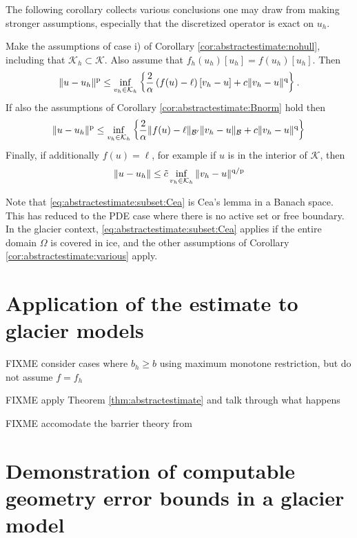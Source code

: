 \documentclass[hidelinks,onefignum,onetabnum,final]{siamart220329}  %
\newcommand{\cB}{\mathcal{B}}
\newcommand{\cK}{\mathcal{K}}
\newcommand{\pp}{{\text{\textnormal{p}}}}
\newcommand{\qq}{{\text{\textnormal{q}}}}
\begin{document}
The following corollary collects various conclusions one may draw from making stronger assumptions, especially that the discretized operator is exact on $u_h$.

\begin{corollary}  \label{cor:abstractestimate:various}  Make the assumptions of case i) of Corollary \ref{cor:abstractestimate:nohull}, including that $\cK_h \subset \cK$.  Also assume that $f_h(u_h)[u_h] = f(u_h)[u_h]$.  Then
\begin{equation}
\|u-u_h\|^\pp \le  \inf_{v_h\in\cK_h} \left\{\frac{2}{\alpha} \left(f(u)-\ell\right)[v_h-u] + c \|v_h - u\|^\qq\right\}. \label{eq:abstractestimate:subset}
\end{equation}
If also the assumptions of Corollary \ref{cor:abstractestimate:Bnorm} hold then
\begin{equation}
\|u-u_h\|^\pp \le \inf_{v_h\in\cK_h} \left\{\frac{2}{\alpha} \|f(u)-\ell\|_{\cB'} \|v_h-u\|_{\cB} + c \|v_h-u\|^\qq\right\} \label{eq:abstractestimate:subset:Bnorm}
\end{equation}
Finally, if additionally $f(u)=\ell$, for example if $u$ is in the interior of $\cK$, then
\begin{equation}
\|u-u_h\| \le \tilde c \inf_{v_h\in\cK_h} \|v_h-u\|^{\qq/\pp} \label{eq:abstractestimate:subset:Cea}
\end{equation}
\end{corollary}

Note that \eqref{eq:abstractestimate:subset:Cea} is Cea's lemma \cite[Theorem 2.4.1]{Ciarlet2002} in a Banach space.  This has reduced to the PDE case where there is no active set or free boundary.  In the glacier context, \eqref{eq:abstractestimate:subset:Cea} applies if the entire domain $\Omega$ is covered in ice, and the other assumptions of Corollary \ref{cor:abstractestimate:various} apply.


\section{Application of the estimate to glacier models} \label{sec:application}

FIXME consider cases where $b_h\ge b$ using maximum monotone restriction, but do not assume $f=f_h$

FIXME apply Theorem \ref{thm:abstractestimate} and talk through what happens

FIXME accomodate the barrier theory from \cite{Bueler2021conservation}


\section{Demonstration of computable geometry error bounds in a glacier model} \label{sec:demo}
\end{document}
